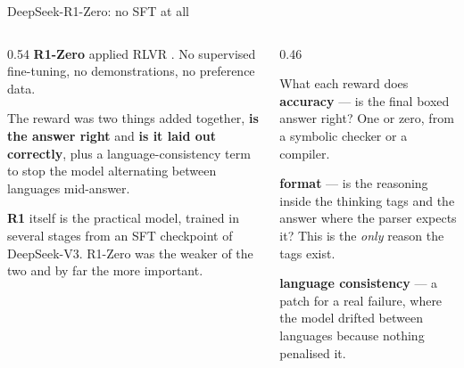 \documentclass[aspectratio=169,10pt]{beamer}
\begin{document}
\begin{frame}{DeepSeek-R1-Zero: no SFT at all}
  \begin{columns}[T]
    \begin{column}{0.54\textwidth}
      \textbf{R1-Zero} applied RLVR . No supervised fine-tuning, no demonstrations, no preference data.
      \vspace{0.5em}

      The reward was two things added together, \textbf{is the answer right}
      and \textbf{is it laid out correctly}, plus a language-consistency term
      to stop the model alternating between languages mid-answer.
      \vspace{0.5em}

      \textbf{R1} itself is the practical model, trained in several stages from
      an SFT checkpoint of DeepSeek-V3. R1-Zero was the weaker of the two and
      by far the more important.
    \end{column}
    \begin{column}{0.46\textwidth}
      \begin{block}{What each reward does}
        \small
        \textbf{accuracy} --- is the final boxed answer right? One or zero,
        from a symbolic checker or a compiler.

        \textbf{format} --- is the reasoning inside the thinking tags and the
        answer where the parser expects it? This is the \emph{only} reason the
        tags exist.

        \textbf{language consistency} --- a patch for a real failure, where
        the model drifted between languages because nothing penalised it.
      \end{block}
    \end{column}
  \end{columns}
\end{frame}
\end{document}
